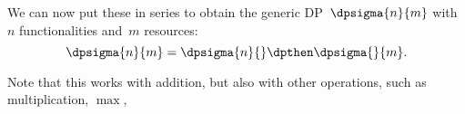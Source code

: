 We can now put these in series to obtain the generic DP~$\dpsigma{n}{m}$ with $n$ functionalities and~$m$ resources:
\begin{equation}
    \dpsigma{n}{m} = \dpsigma{n}{} \dpthen \dpsigma{}{m}.
\end{equation}
%

Note that this works with addition, but also with other  operations, such as multiplication, $\max$, \etc
